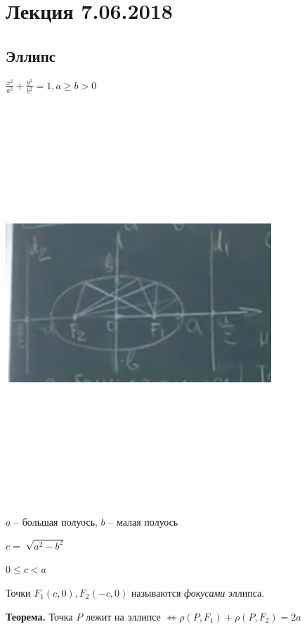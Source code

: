 \section{Лекция 7.06.2018}

\subsection{Эллипс}

$\frac{x^2}{a^2} + \frac{y^2}{b^2} = 1, a \geqslant b > 0$

\vspace{\baselineskip}
\includegraphics[width=10cm,height=15cm,keepaspectratio]{example3.jpg}

\vspace{\baselineskip}
$a$ -- большая полуось, $b$ -- малая полуось

$c = \sqrt[]{a^2 - b^2}$

$0 \leqslant c < a$

Точки $F_1(c, 0), F_2(-c, 0)$ называются \textit{фокусами} эллипса.

\vspace{\baselineskip}
\textbf{Теорема.} Точка $P$ лежит на эллипсе $\Leftrightarrow \rho(P, F_1) + \rho(P, F_2) = 2a$

